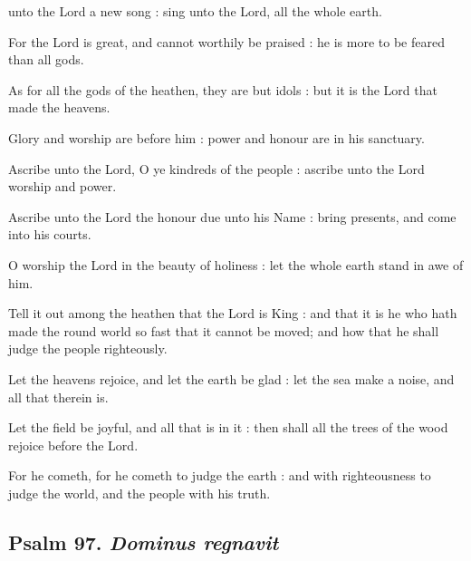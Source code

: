  unto the Lord a new song : sing unto the Lord, all the whole earth.\par
{}
For the Lord is great, and cannot worthily be praised : he is more to be feared than all gods.\par
{}As for all the gods of the heathen, they are but idols : but it is the Lord that made the heavens.\par
{}Glory and worship are before him : power and honour are in his sanctuary.\par
{}Ascribe unto the Lord, O ye kindreds of the people : ascribe unto the Lord worship and power.\par
{}Ascribe unto the Lord the honour due unto his Name : bring presents, and come into his courts.\par
{}O worship the Lord in the beauty of holiness : let the whole earth stand in awe of him.\par
{}Tell it out among the heathen that the Lord is King : and that it is he who hath made the round world so fast that it cannot be moved; and how that he shall judge the people righteously.\par
{}Let the heavens rejoice, and let the earth be glad : let the sea make a noise, and all that therein is.\par
{}Let the field be joyful, and all that is in it : then shall all the trees of the wood rejoice before the Lord.\par
{}For he cometh, for he cometh to judge the earth : and with righteousness to judge the world, and the people with his truth.\par

\clearpage
\subsection{Psalm 97. \textit{Dominus regnavit}}

